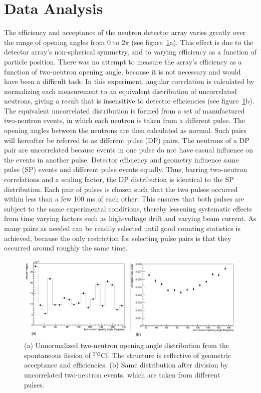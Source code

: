 \section{Data Analysis}
\label{Analysis}
The efficiency and acceptance of the neutron detector array varies greatly over the range of opening angles from 0 to 2$\pi$ (see figure~\ref{fig:OpeningAngleAcceptance}a).
This effect is due to the detector array's non-spherical symmetry, and to varying efficiency as a function of particle position.
There was no attempt to measure the array's efficiency as a function of two-neutron opening angle, because it is not necessary and would have been a difficult task.
In this experiment, angular correlation is calculated by normalizing each measurement to an equivalent distribution of uncorrelated neutrons, giving a result that is insensitive to detector efficiencies (see figure~\ref{fig:OpeningAngleAcceptance}b).
The equivalent uncorrelated distribution is formed from a set of manufactured two-neutron events, in which each neutron is taken from a different pulse.
The opening angles between the neutrons are then calculated as normal.
Such pairs will hereafter be referred to as different pulse (DP) pairs.
The neutrons of a DP pair are uncorrelated because events in one pulse do not have casual influence on the events in another pulse.
Detector efficiency and geometry influence same pulse (SP) events and different pulse events equally.
Thus, barring two-neutron correlations and a scaling factor, the DP distribution is identical to the SP distribution.
Each pair of pulses is chosen such that the two pulses occurred within less than a few 100 ms of each other.
This ensures that both pulses are subject to the same experimental conditions, thereby lessening systematic effects from time varying factors such as high-voltage drift and varying beam current.
As many pairs as needed can be readily selected until good counting statistics is achieved, because the only restriction for selecting pulse pairs is that they occurred around roughly the same time.
\begin{figure}
    \centering
    \includegraphics[width  = \textwidth ]{Content/Methods/Normalization.png}
    \caption{(a) Unnormalized two-neutron opening angle distribution from the spontaneous fission of $^{252}$Cf. The structure is reflective of geometric acceptance and efficiencies. (b) Same distribution after division by uncorrelated two-neutron events, which are taken from different pulses.}
    \label{fig:OpeningAngleAcceptance}
    \label{fig:OpeningAngleAcceptance}
\end{figure}
